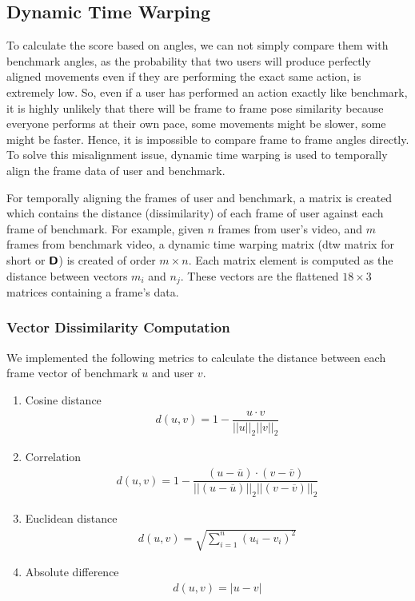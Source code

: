 \subsection{Dynamic Time Warping}
\label{section:dtw}
To calculate the score based on angles, we can not simply compare them with benchmark angles, as the probability that two users will produce perfectly aligned movements even if they are performing the exact same action, is extremely low. So, even if a user has performed an action exactly like benchmark, it is highly unlikely that there will be frame to frame pose similarity because everyone performs at their own pace, some movements might be slower, some might be faster. Hence, it is impossible to compare frame to frame angles directly. To solve this misalignment issue, dynamic time warping is used to temporally align the frame data of user and benchmark.

For temporally aligning the frames of user and benchmark, a matrix is created which contains the distance (dissimilarity) of each frame of user against each frame of benchmark. For example, given $n$ frames from user's video, and $m$ frames from benchmark video, a dynamic time warping matrix (dtw matrix for short or $\boldsymbol { \mathsf{D}}$) is created of order $m \times n$. Each matrix element is computed as the distance between vectors $m_i$ and $n_j$. These vectors are the flattened $18 \times 3$ matrices containing a frame's data. 

\subsubsection{Vector Dissimilarity Computation}
We implemented the following metrics to calculate the distance between each frame vector of benchmark $u$ and user $v$. 

\begin{enumerate}
  \item Cosine distance 
    \begin{align}
       d(u,v) = 1 - \dfrac{u \cdot v}{||u||_2  ||v||_2}
    \end{align}
  \item Correlation
    \begin{align}
      d(u,v) = 1 - \dfrac{(u- \overline{u}) \cdot (v- \overline{v})}{||(u- \overline{u})||_2  ||(v- \overline{v})||_2}
    \end{align}
  \item Euclidean distance
    \begin{align}
      d(u,v) = \sqrt{\sum_{i=1}^{n}(u_i - v_i)^2}
    \end{align}
  \item Absolute difference
    \begin{align}
      d(u,v) =  | u - v |
    \end{align}
\end{enumerate}


